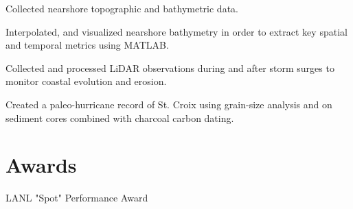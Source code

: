 \documentclass[]{deedy-resume-openfont}
\begin{document}
\begin{minipage}[t]{0.60\textwidth}
\begin{tightemize}
	\item Collected nearshore topographic and bathymetric data.
	\item Interpolated, and visualized nearshore bathymetry in order to extract key spatial and temporal metrics using MATLAB.
\end{tightemize}
\sectionsep

\begin{tightemize}
	\item Collected and processed LiDAR observations during and after storm surges to monitor coastal evolution and erosion.
	\item Created a paleo-hurricane record of St. Croix using grain-size analysis and on sediment cores combined with charcoal carbon dating.
\end{tightemize}
\sectionsep



\section{Awards}
LANL "Spot" Performance Award

	
\end{minipage}
\end{document}

